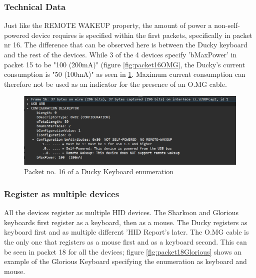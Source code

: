 \subsubsection{Technical Data}

Just like the REMOTE WAKEUP property, the amount of power a non-self-powered device requires is specified within the first packets, specifically in packet nr 16. The difference that can be observed here is between the Ducky keyboard and the rest of the devices. While 3 of the 4 devices specify 'bMaxPower' in packet 15 to be "100 (200mA)" (figure \ref{fig:packet16OMG}, the Ducky's current consumption is "50 (100mA)" as seen in \ref{fig:packet16Ducky}. Maximum current consumption can therefore not be used as an indicator for the presence of an O.MG cable. 


\begin{figure}[H]
    \centering
    \includegraphics[width=0.75\linewidth]{visuals/no-remote-wakeup-100mA.png}
    \caption{Packet no. 16 of a Ducky Keyboard enumeration}
    \label{fig:packet16Ducky}
\end{figure}


\subsubsection{Register as multiple devices}

All the devices register as multiple HID devices. The Sharkoon and Glorious keyboards first register as a keyboard, then as a mouse. The Ducky registers as keyboard first and as multiple different 'HID Report's later. The O.MG cable is the only one that registers as a mouse first and as a keyboard second. This can be seen in packet 18 for all the devices; figure \ref{fig:packet18Glorious} shows an example of the Glorious Keyboard specifying the enumeration as keyboard and mouse. 


